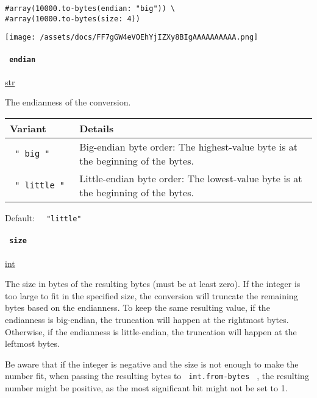 \begin{verbatim}
#array(10000.to-bytes(endian: "big")) \
#array(10000.to-bytes(size: 4))
\end{verbatim}

\texttt{[image: /assets/docs/FF7gGW4eVOEhYjIZXy8BIgAAAAAAAAAA.png]}

\paragraph{\texorpdfstring{\texttt{\ endian\ }}{ endian }}\label{definitions-to-bytes-endian}

\href{/docs/reference/foundations/str/}{str}

The endianness of the conversion.

\begin{longtable}[]{@{}ll@{}}
\toprule\noalign{}
Variant & Details \\
\midrule\noalign{}
\endhead
\bottomrule\noalign{}
\endlastfoot
\texttt{\ "\ big\ "\ } & Big-endian byte order: The highest-value byte
is at the beginning of the bytes. \\
\texttt{\ "\ little\ "\ } & Little-endian byte order: The lowest-value
byte is at the beginning of the bytes. \\
\end{longtable}

Default: \texttt{\ }{\texttt{\ "little"\ }}\texttt{\ }

\paragraph{\texorpdfstring{\texttt{\ size\ }}{ size }}\label{definitions-to-bytes-size}

\href{/docs/reference/foundations/int/}{int}

The size in bytes of the resulting bytes (must be at least zero). If the
integer is too large to fit in the specified size, the conversion will
truncate the remaining bytes based on the endianness. To keep the same
resulting value, if the endianness is big-endian, the truncation will
happen at the rightmost bytes. Otherwise, if the endianness is
little-endian, the truncation will happen at the leftmost bytes.

Be aware that if the integer is negative and the size is not enough to
make the number fit, when passing the resulting bytes to
\texttt{\ int.from-bytes\ } , the resulting number might be positive, as
the most significant bit might not be set to 1.


